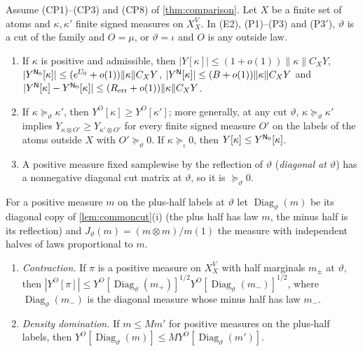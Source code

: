\begin{lemma}\label{lem:energy-toolkit}
Assume (CP1)--(CP3) and (CP8) of \cref{thm:comparison}. Let $X$ be a finite
set of atoms and $\kappa,\kappa'$ finite signed measures on $X_X^V$. In (E2),
(P1)--(P3) and (P3$'$), $\vartheta$ is a cut of the family and $O=\mu$, or
$\vartheta=\iota$ and $O$ is any outside law.
\begin{enumerate}[label=(E\arabic*)]
\item\label{it:record:E1} If $\kappa$ is positive and admissible, then
 $|Y[\kappa]|\le(1+o(1))\|\kappa\|C_XY$,
 $|Y^{\mathsf N_0}[\kappa]|\le(e^{U_0}+o(1))\|\kappa\|C_XY$,
 $|Y^{\mathsf N}[\kappa]|\le(B+o(1))\|\kappa\|C_XY$ and
 $|Y^{\mathsf N}[\kappa]-Y^{\mathsf N_0}[\kappa]|\le(R_{\rm err}+o(1))\|\kappa\|C_XY$.
\item\label{it:record:E2} If $\kappa\succeq_\vartheta\kappa'$, then
 $Y^O[\kappa]\ge Y^O[\kappa']$; more generally, at any cut $\vartheta$,
 $\kappa\succeq_\vartheta\kappa'$ implies $Y_{\kappa\otimes O'}\ge Y_{\kappa'\otimes O'}$
 for every finite signed measure $O'$ on the labels of the atoms outside $X$
 with $O'\succeq_\vartheta0$. If $\kappa\succeq_\iota0$, then
 $Y[\kappa]\le Y^{\mathsf N_0}[\kappa]$.
\item\label{it:record:E3} A positive measure fixed samplewise by the
 reflection of $\vartheta$ (\emph{diagonal at $\vartheta$}) has a
 nonnegative diagonal cut matrix at $\vartheta$, so it is $\succeq_\vartheta0$.
\end{enumerate}
For a positive measure $m$ on the plus-half labels at $\vartheta$ let
$\operatorname{Diag}_\vartheta(m)$ be its diagonal copy of
\cref{lem:commoncut}(i) (the plus half has law $m$, the minus half is its
reflection) and $J_\vartheta(m)=(m\otimes m)/m(1)$ the measure with
independent halves of laws proportional to $m$.
\begin{enumerate}[label=(P\arabic*)]
\item\label{it:record:P1} \emph{Contraction.} If $\pi$ is a positive measure on
 $X_X^V$ with half marginals $m_\pm$ at $\vartheta$, then
 $|Y^O[\pi]|\le Y^O[\operatorname{Diag}_\vartheta(m_+)]^{1/2}
 Y^O[\operatorname{Diag}_\vartheta(m_-)]^{1/2}$, where
 $\operatorname{Diag}_\vartheta(m_-)$ is the diagonal measure whose minus half
 has law $m_-$.
\item\label{it:record:P2} \emph{Density domination.} If $m\le Mm'$ for positive
 measures on the plus-half labels, then
 $Y^O[\operatorname{Diag}_\vartheta(m)]\le MY^O[\operatorname{Diag}_\vartheta(m')]$.

\end{enumerate}
\end{lemma}
